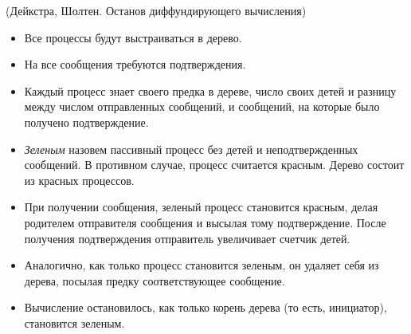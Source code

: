 \begin{algorithm}(Дейкстра, Шолтен. Останов диффундирующего вычисления)
    \enewline
    \begin{itemize}
        \item Все процессы будут выстраиваться в дерево.
        \item На все сообщения требуются подтверждения.
        \item Каждый процесс знает своего предка в дереве, число своих детей
            и разницу между числом отправленных сообщений, и сообщений,
            на которые было получено подтверждение.
        \item \textit{Зеленым} назовем пассивный процесс без детей
            и неподтвержденных сообщений. В противном случае, процесс
            считается красным. Дерево состоит из красных процессов.
        \item При получении сообщения, зеленый процесс становится красным,
            делая родителем отправителя сообщения и высылая тому подтверждение.
            После получения подтверждения отправитель увеличивает счетчик детей.
        \item Аналогично, как только процесс становится зеленым, он удаляет себя
            из дерева, посылая предку соответствующее сообщение.
        \item Вычисление остановилось, как только корень дерева (то есть, инициатор),
            становится зеленым.
    \end{itemize}
\end{algorithm}

